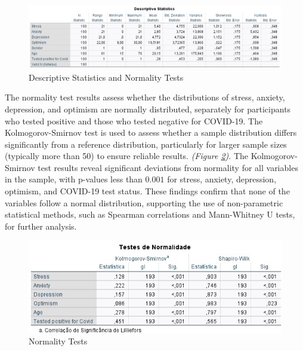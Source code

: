 \documentclass[a4paper]{article}
\begin{document}
\begin{figure}[ht]
  \centering
  \caption{Descriptive Statistics and Normality Tests}
  \label{fig:descriptiveSts}
  \includegraphics[width=\textwidth]{img/descriptive_statistics.png}  %
\end{figure}

\vspace{3em}
\noindent
The normality test results assess whether the distributions of stress, anxiety, depression, and optimism are normally distributed,
separately for participants who tested positive and those who tested negative for COVID-19.
The Kolmogorov-Smirnov test is used to assess whether a sample distribution differs significantly from a reference distribution,
particularly for larger sample sizes (typically more than 50) to ensure reliable results. \textit{(Figure \ref{fig:normalityTest})}.
\vspace{0.5em}\newline
The Kolmogorov-Smirnov test results reveal significant deviations from normality for all variables in the sample,
with p-values less than \(\boldsymbol{0.001}\) for stress, anxiety, depression, optimism, and COVID-19 test status.
These findings confirm that none of the variables follow a normal distribution, supporting the use of non-parametric statistical methods,
such as Spearman correlations and Mann-Whitney U tests, for further analysis.
\vspace{1.5em}

\begin{figure}[H]
  \centering
  \caption{Normality Tests}
  \label{fig:normalityTest}
  \includegraphics[width=\textwidth]{img/normality_test.png}  %
\end{figure}
\end{document}
